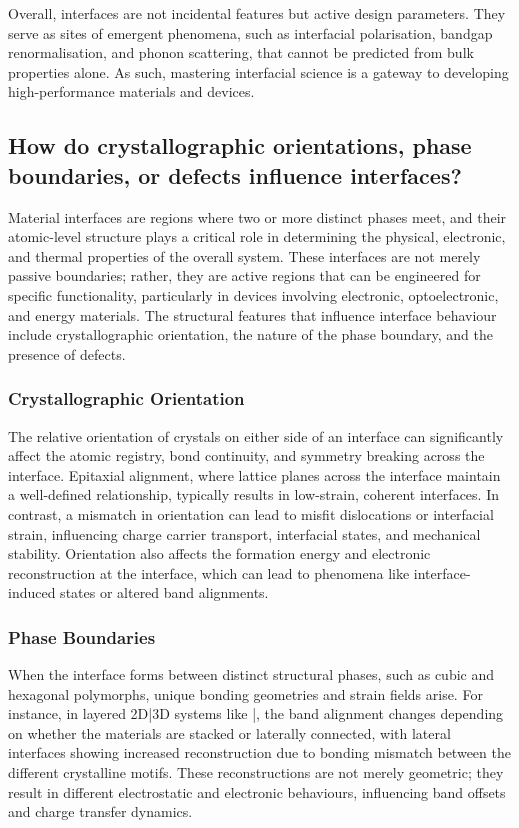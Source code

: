 Overall, interfaces are not incidental features but active design parameters. They serve as sites of emergent phenomena, such as interfacial polarisation, bandgap renormalisation, and phonon scattering, that cannot be predicted from bulk properties alone. As such, mastering interfacial science is a gateway to developing high-performance materials and devices.

\subsection{How do crystallographic orientations, phase boundaries, or defects influence interfaces?} 

Material interfaces are regions where two or more distinct phases meet, and their atomic-level structure plays a critical role in determining the physical, electronic, and thermal properties of the overall system. These interfaces are not merely passive boundaries; rather, they are active regions that can be engineered for specific functionality, particularly in devices involving electronic, optoelectronic, and energy materials. The structural features that influence interface behaviour include crystallographic orientation, the nature of the phase boundary, and the presence of defects.

\subsubsection{Crystallographic Orientation} 

The relative orientation of crystals on either side of an interface can significantly affect the atomic registry, bond continuity, and symmetry breaking across the interface. Epitaxial alignment, where lattice planes across the interface maintain a well-defined relationship, typically results in low-strain, coherent interfaces. In contrast, a mismatch in orientation can lead to misfit dislocations or interfacial strain, influencing charge carrier transport, interfacial states, and mechanical stability. Orientation also affects the formation energy and electronic reconstruction at the interface, which can lead to phenomena like interface-induced states or altered band alignments.

\subsubsection{Phase Boundaries} 

When the interface forms between distinct structural phases, such as cubic and hexagonal polymorphs, unique bonding geometries and strain fields arise. For instance, in layered 2D|3D systems like |, the band alignment changes depending on whether the materials are stacked or laterally connected, with lateral interfaces showing increased reconstruction due to bonding mismatch between the different crystalline motifs. These reconstructions are not merely geometric; they result in different electrostatic and electronic behaviours, influencing band offsets and charge transfer dynamics.

